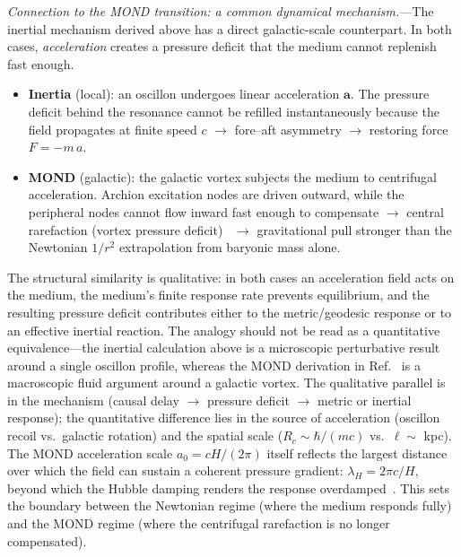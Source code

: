 \documentclass[aps,prd,onecolumn,superscriptaddress,nofootinbib,showpacs,12pt,notitlepage]{revtex4-2}
\begin{document}
\textit{Connection to the MOND transition: a common
dynamical mechanism.}---The inertial mechanism derived
above has a direct galactic-scale counterpart.  In both
cases, \emph{acceleration} creates a pressure deficit
that the medium cannot replenish fast enough.

\begin{itemize}
\item \textbf{Inertia} (local): an oscillon undergoes
  linear acceleration $\mathbf{a}$.  The pressure
  deficit behind the resonance cannot be refilled
  instantaneously because the field propagates at
  finite speed $c$ $\to$ fore--aft asymmetry $\to$
  restoring force $F = -m\,a$.
\item \textbf{MOND} (galactic): the galactic vortex
  subjects the medium to centrifugal acceleration.
  Archion excitation nodes are driven outward, while
  the peripheral nodes cannot flow inward fast enough to
  compensate $\to$ central rarefaction (vortex
  pressure deficit)~\cite{Lotishvili2026MOND} $\to$
  gravitational pull stronger than the Newtonian
  $1/r^{2}$ extrapolation from baryonic mass alone.
\end{itemize}

The structural similarity is qualitative: in both
cases an acceleration field acts on the medium, the
medium's finite response rate prevents equilibrium,
and the resulting pressure deficit contributes either to the
metric/geodesic response or to an effective inertial reaction.  The
analogy should not be read as a quantitative
equivalence---the inertial calculation above is a
microscopic perturbative result around a single
oscillon profile, whereas the MOND derivation
in Ref.~\cite{Lotishvili2026MOND} is a macroscopic
fluid argument around a galactic vortex.  The
qualitative parallel is in the mechanism (causal
delay $\to$ pressure deficit $\to$ metric or inertial response);
the quantitative difference lies in the source of
acceleration (oscillon recoil vs.\ galactic
rotation) and the spatial scale ($R_{c} \sim
\hbar/(mc)$ vs.\ $\ell \sim$ kpc).  The MOND
acceleration scale $a_{0} = cH/(2\pi)$
itself reflects the largest distance over which
the field can sustain a coherent pressure gradient:
$\lambda_{H} = 2\pi c/H$, beyond which the Hubble
damping renders the response
overdamped~\cite{Lotishvili2026MOND}.  This sets
the boundary between the Newtonian regime (where the
medium responds fully) and the MOND regime (where
the centrifugal rarefaction is no longer compensated).
\end{document}
